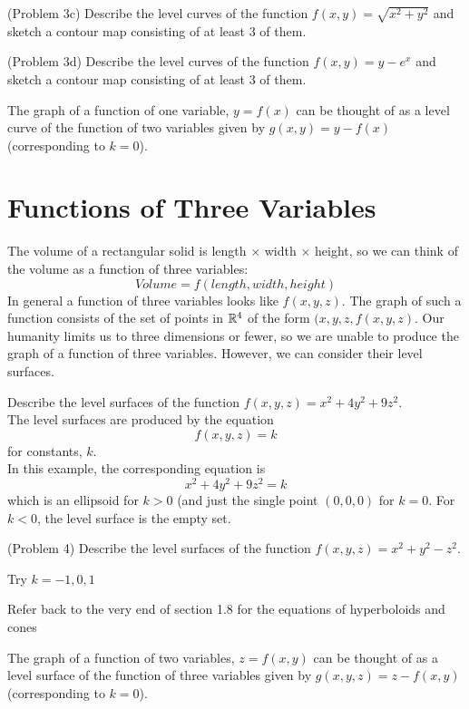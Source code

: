 \documentclass[handout]{ximera}
\begin{document}
\begin{problem}(Problem 3c)
Describe the level curves of the function $f(x, y) = \sqrt{x^2 + y^2}$ and sketch a contour map consisting of at least 3 of them.\\
\end{problem}

\begin{problem}(Problem 3d)
Describe the level curves of the function $f(x,y) = y - e^x$ and sketch a contour map consisting of at least 3 of them.\\
\end{problem}

\begin{remark}
The graph of a function of one variable, $y= f(x)$ can be thought of as a level curve of the function of two variables given by $g(x, y) = y-f(x)$
(corresponding to $k = 0$).
\end{remark}

\section{Functions of Three Variables}
The volume of a rectangular solid is length $\times$ width $\times $ height, so we can think of the volume as a function of three variables:
\[
Volume = f(length, width, height)
\]
In general a function of three variables looks like $f(x, y, z)$.
The graph of such a function consists of the set of points in $\mathbb R^4$ of the form $(x, y, z, f(x, y, z)$.
Our humanity limits us to three dimensions or fewer, so we are unable to produce the graph of a function of three variables.
However, we can consider their level surfaces.

\begin{example}[Example 4]
Describe the level surfaces of the function $f(x, y, z) = x^2 + 4y^2 + 9 z^2$.\\
The level surfaces are produced by the equation
\[
f(x, y, z) = k
\]
for constants, $k$.\\
In this example, the corresponding equation is
\[
x^2 + 4y^2 + 9z^2 = k
\]
which is an ellipsoid for $k >0$ (and just the single point $(0, 0, 0)$ for $k = 0$.
For $k<0$, the level surface is the empty set.
\end{example}

\begin{problem}(Problem 4)
Describe the level surfaces of the function $f(x, y, z) = x^2 + y^2 - z^2$.\\
\begin{hint}
Try $k = -1, 0, 1$
\end{hint}
\begin{hint}
Refer back to the very end of section 1.8 for the equations of hyperboloids and cones
\end{hint}
\end{problem}

\begin{remark}
The graph of a function of two variables, $z= f(x,y)$ can be thought of as a level surface of the function of three variables given by $g(x, y, z) = z-f(x,y)$
(corresponding to $k = 0$).
\end{remark}
\end{document}
